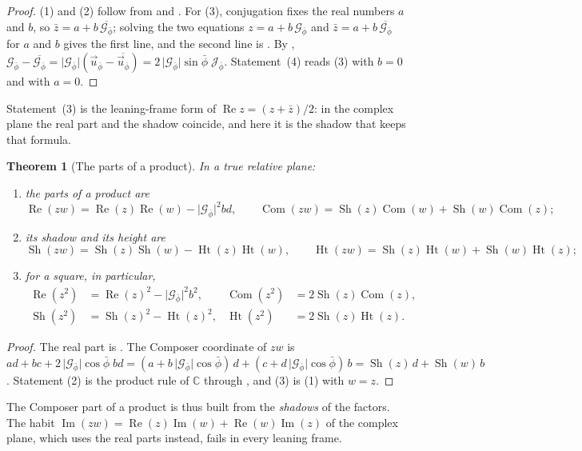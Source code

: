 \documentclass[11pt,a4paper]{amsart}
\theoremstyle{plain}
\newtheorem{theorem}{Theorem}[section]
\theoremstyle{definition}
\theoremstyle{remark}
\newcommand{\pb}{\bar{\phi}}                     %
\newcommand{\Gp}{\mathcal{G}_{\bar{\phi}}}       %
\newcommand{\up}{\vec{u}_{\bar{\phi}}}           %
\newcommand{\Jp}{\mathcal{J}_{\bar{\phi}}}       %
\newcommand{\C}{\mathbb{C}}
\renewcommand{\Re}{\operatorname{Re}}            %
\DeclareMathOperator{\Com}{Com}                  %
\DeclareMathOperator{\Sh}{Sh}                    %
\DeclareMathOperator{\Ht}{Ht}                    %
\begin{document}
\begin{proof}
(1) and (2) follow from  and . For (3), conjugation fixes the real numbers $a$ and $b$, so $\bar{z} = a + b\,\overline{\Gp}$; solving the two equations $z = a + b\,\Gp$ and $\bar{z} = a + b\,\overline{\Gp}$ for $a$ and $b$ gives the first line, and the second line is . By , $\Gp - \overline{\Gp} = \lvert\Gp\rvert(\up - \overline{\up}) = 2\,\lvert\Gp\rvert\sin\pb\;\Jp$. Statement~(4) reads (3) with $b = 0$ and with $a = 0$.
\end{proof}

Statement~(3) is the leaning-frame form of $\operatorname{Re} z = (z + \bar{z})/2$: in the complex plane the real part and the shadow coincide, and here it is the shadow that keeps that formula.

\begin{theorem}[The parts of a product]\label{thm:parts-product}
In a true relative plane:
\begin{enumerate}
  \item the parts of a product are
  \[
  \Re(zw) = \Re(z)\Re(w) - \lvert\Gp\rvert^2bd , \qquad \Com(zw) = \Sh(z)\Com(w) + \Sh(w)\Com(z) ;
  \]
  \item its shadow and its height are
  \[
  \Sh(zw) = \Sh(z)\Sh(w) - \Ht(z)\Ht(w) , \qquad \Ht(zw) = \Sh(z)\Ht(w) + \Sh(w)\Ht(z) ;
  \]
  \item for a square, in particular,
  \begin{align*}
  \Re(z^2) &= \Re(z)^2 - \lvert\Gp\rvert^2b^2 , & \Com(z^2) &= 2\Sh(z)\Com(z) , \\
  \Sh(z^2) &= \Sh(z)^2 - \Ht(z)^2 , & \Ht(z^2) &= 2\Sh(z)\Ht(z) .
  \end{align*}
\end{enumerate}
\end{theorem}

\begin{proof}
The real part is . The Composer coordinate of $zw$ is $ad + bc + 2\,\lvert\Gp\rvert\cos\pb\;bd = (a + b\,\lvert\Gp\rvert\cos\pb)\,d + (c + d\,\lvert\Gp\rvert\cos\pb)\,b = \Sh(z)\,d + \Sh(w)\,b$. Statement (2) is the product rule of $\C$ through , and (3) is (1) with $w = z$.
\end{proof}

The Composer part of a product is thus built from the \emph{shadows} of the factors. The habit $\operatorname{Im}(zw) = \operatorname{Re}(z)\operatorname{Im}(w) + \operatorname{Re}(w)\operatorname{Im}(z)$ of the complex plane, which uses the real parts instead, fails in every leaning frame.
\end{document}
